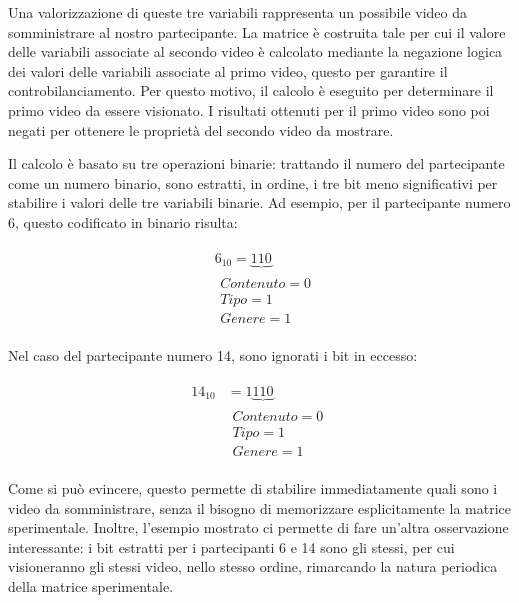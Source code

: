 Una valorizzazione di queste tre variabili rappresenta un possibile video da somministrare al nostro partecipante. La matrice è costruita tale per cui il valore delle variabili associate al secondo video è calcolato mediante la negazione logica dei valori delle variabili associate al primo video, questo per garantire il controbilanciamento. Per questo motivo, il calcolo è eseguito per determinare il primo video da essere visionato. I risultati ottenuti per il primo video sono poi negati per ottenere le proprietà del secondo video da mostrare.

Il calcolo è basato su tre operazioni binarie: trattando il numero del partecipante come un numero binario, sono estratti, in ordine, i tre bit meno significativi per stabilire i valori delle tre variabili binarie. Ad esempio, per il partecipante numero 6, questo codificato in binario risulta:

\begin{align}
    \begin{split}
             &6_{10} = \underbrace{110} \\
         &\begin{array}{c}
            Contenuto = 0 \\
            Tipo = 1 \\
            Genere = 1
         \end{array}
    \end{split}
\end{align}

Nel caso del partecipante numero 14, sono ignorati i bit in eccesso:

\begin{align}
    \begin{split}
             14_{10}& = {1\underbrace{110}} \\ 
         &\begin{array}{c}
            Contenuto = 0 \\
            Tipo = 1 \\
            Genere = 1
         \end{array}
    \end{split}
\end{align}

Come si può evincere, questo permette di stabilire immediatamente quali sono i video da somministrare, senza il bisogno di memorizzare esplicitamente la matrice sperimentale. Inoltre, l'esempio mostrato ci permette di fare un'altra osservazione interessante: i bit estratti per i partecipanti 6 e 14 sono gli stessi, per cui visioneranno gli stessi video, nello stesso ordine, rimarcando la natura periodica della matrice sperimentale.

